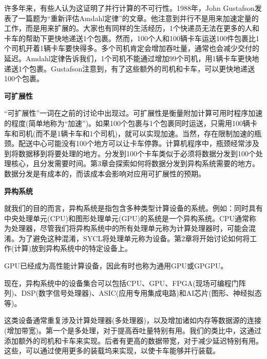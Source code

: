 许多年来，有些人认为这证明了并行计算的不可行性。1988年，John Gustafson发表了一篇题为“重新评估Amdahl定律”的文章。他注意到并行不是用来加速定量的工作，而是用来扩展的。大家也有同样的生活经历，1个快递员无法在更多的人和卡车的帮助下更快地递送1个包裹。然而，100个人和100辆卡车运送100件包裹比1个司机开着1辆卡车要快得多。多个司机肯定会增加吞吐量，通常也会减少交付的延迟。Amdahl定律告诉我们，1个司机不能通过增加99个司机，用1辆卡车更快地递送1个包裹。Gustafson注意到，有了这些额外的司机和卡车，可以更快地递送100个包裹。\par

\hspace*{\fill} \par %
\textbf{可扩展性}

“可扩展性”一词在之前的讨论中出现过。可扩展性是衡量附加计算可用时程序加速的程度(简单地称为“加速”)。如果100个包裹与1个包裹同时运送，只需用100辆卡车和司机(而不是1辆卡车和1个司机)，就可以实现加速。当然，存在限制加速的瓶颈。配送中心可能没有100个地方可以让卡车停靠。计算机程序中，瓶颈经常涉及到将数据移到将要处理的地方。分发到100个卡车类似于必须将数据分发到100个处理核心，且分发需要时间。第3章会探索如何将数据分发到异构系统需要的地方。数据分发是有成本的，而该成本会影响对应用可扩展性的预期。\par

\hspace*{\fill} \par %
\textbf{异构系统}

就我们的目的而言，异构系统是指包含多种类型计算设备的系统。例如：同时具有中央处理单元(CPU)和图形处理单元(GPU)的系统是一个异构系统。CPU通常称为处理器，尽管我们将异构系统中的所有处理单元称为计算处理器时，可能会混淆。为了避免这种混淆，SYCL将处理单元称为设备。第2章将开始讨论如何将工作(计算)放到异构系统中的特定设备上。\par

GPU已经成为高性能计算设备，因此有时也称为通用GPU或GPGPU。\par

现在，异构系统中的设备集合可以包括CPU、GPU、FPGA(现场可编程门阵列)、DSP(数字信号处理器)、ASIC(应用专用集成电路)和AI芯片(图形、神经拟态等)。\par

这类设备通常重复涉及计算处理器(多处理器)，以及增加诸如内存等数据源的连接(增加带宽)。第一个是多处理，对于提高吞吐量特别有用。我们的类比中，这通过添加额外的司机和卡车来实现。后者有更高的数据带宽，对于减少延迟特别有用。这些，可以通过使用更多的装载坞来实现，以使卡车能够并行装载。\par

